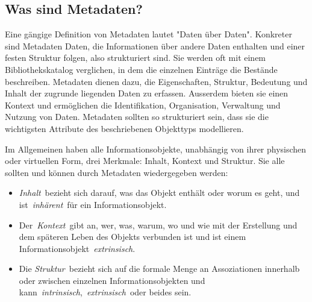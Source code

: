 \documentclass[
  letterpaper,
  DIV=11,
  numbers=noendperiod]{scrartcl}
\begin{document}
\subsection{Was sind Metadaten?}\label{was-sind-metadaten}

Eine gängige Definition von Metadaten lautet "Daten über Daten".
Konkreter sind Metadaten Daten, die Informationen über andere Daten
enthalten und einer festen Struktur folgen, also strukturiert sind. Sie
werden oft mit einem Bibliothekskatalog verglichen, in dem die einzelnen
Einträge die Bestände beschreiben. Metadaten dienen dazu, die
Eigenschaften, Struktur, Bedeutung und Inhalt der zugrunde liegenden
Daten zu erfassen. Ausserdem bieten sie einen Kontext und ermöglichen
die Identifikation, Organisation, Verwaltung und Nutzung von Daten.
Metadaten sollten so strukturiert sein, dass sie die wichtigsten
Attribute des beschriebenen Objekttyps modellieren.

Im Allgemeinen haben alle Informationsobjekte, unabhängig von ihrer
physischen oder virtuellen Form, drei Merkmale: Inhalt, Kontext und
Struktur. Sie alle sollten und können durch Metadaten wiedergegeben
werden:

\begin{itemize}
\item
  \emph{Inhalt}~bezieht sich darauf, was das Objekt enthält oder worum
  es geht, und ist~\emph{inhärent}~für ein Informationsobjekt.
\item
  Der~\emph{Kontext}~gibt an, wer, was, warum, wo und wie mit der
  Erstellung und dem späteren Leben des Objekts verbunden ist und ist
  einem Informationsobjekt~\emph{extrinsisch}.
\item
  Die \emph{Struktur}~bezieht sich auf die formale Menge an
  Assoziationen innerhalb oder zwischen einzelnen Informationsobjekten
  und kann~\emph{intrinsisch},~\emph{extrinsisch}~oder beides sein.
\end{itemize}
\end{document}
